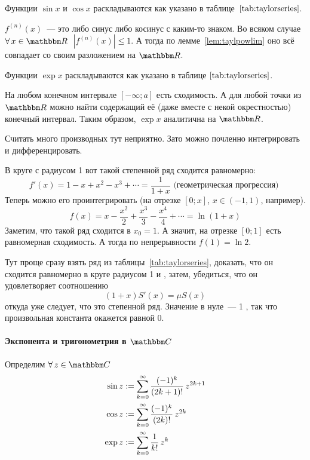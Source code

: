 \documentclass[12pt]{../../notes}
\begin{document}
\begin{lem}\label{lem:sinseries}
  Функции $\sin x$ и $\cos x$ раскладываются как указано в таблице~$\ref{tab:taylorseries}$. 
\end{lem}
\begin{itlproof}
  $f^{(n)}(x)$~--- это либо синус либо косинус с каким-то знаком. 
  Во всяком случае $\forall\,x \in \R\;$ $|f^{(n)}(x)|\leqslant 1$.
  А тогда по лемме~\ref{lem:taylpowlim} оно всё совпадает со своим разложением на $\R$. 
\end{itlproof}

\begin{lem}\label{lem:expseries}
  Функции $\exp x$ раскладываются как указано в таблице $\ref{tab:taylorseries}$. 
\end{lem}
\begin{itlproof}
  На любом конечном интервале $[-\infty;a]$ есть сходимость. А для любой точки из $\R$ можно
  найти содержащий её (даже вместе с некой окрестностью) конечный интервал. Таким образом, $\exp x$ аналитична 
  на $\R$.
\end{itlproof}


\begin{itlproof}
  Считать много производных тут неприятно. Зато можно почленно интегрировать и дифференцировать.
 
  В круге с радиусом 1 вот такой степенной ряд сходится равномерно:
  \[
    f'(x) = 1 - x + x^2 - x^3 + \dotsb = \frac{1}{1+x}\text{ (геометрическая прогрессия) }
  \]
  Теперь можно его проинтегрировать (на отрезке $[0;x]$, $x\in (-1,1)$, например).
  \[
    f(x) = x - \frac{x^2}{2} + \frac{x^3}{3} - \frac{x^4}{4} + \dotsb = \ln (1+x)
  \]
  Заметим, что такой ряд сходится в $x_0 = 1$. А значит, на отрезке $[0;1]$ есть равномерная сходимость.
  А тогда по непрерывности $f(1)=\ln 2$. 
\end{itlproof}

\begin{itlproof}
  Тут проще сразу взять ряд из таблицы~\ref{tab:taylorseries}, доказать, что он сходится равномерно 
  в круге радиусом 1 и , затем, убедиться, что он удовлетворяет соотношению
  \[
    (1+x) S'(x) = \mu S(x)
  \]
  откуда уже следует, что это степенной ряд. 
  Значение в нуле~--- 1 , так что произвольная константа окажется равной 0.
\end{itlproof}

\paragraph{Экспонента и тригонометрия в \texorpdfstring{$\C$}{}}
\begin{defn}\label{defn:expsincompl}
  Определим $\forall\,z\in \C$
  \begin{align*}
    \sin z & := \displaystyle\sum_{k=0}^{\infty} \frac{(-1)^k}{(2k+1)!}\,z^{2k+1}  \\
    \cos z & := \displaystyle\sum_{k=0}^{\infty} \frac{(-1)^k}{(2k)!}\,z^{2k}   \\
    \exp z & := \displaystyle\sum_{k=0}^{\infty} \frac{1}{k!}\,z^{k}
  \end{align*}
\end{defn}
\end{document}
